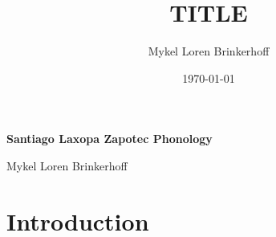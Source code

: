 \documentclass[12pt, letterpaper]{article}
\title{TITLE}
\author{Mykel Loren Brinkerhoff}
\date{\today}
\begin{document}
	
	
\begin{center}
	{\Large \textbf{Santiago Laxopa Zapotec Phonology}}
	\vspace{6pt}

	Mykel Loren Brinkerhoff
\end{center}
\thispagestyle{fancy}





\section{Introduction} \label{sec:Introduction}
\end{document}
